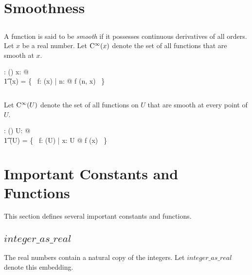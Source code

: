 \documentclass[11pt, oneside]{article}
\begin{document}
\section{Smoothness}

\subsection{}

A function is said to be {\it smooth} if it possesses continuous derivatives of all orders.
Let $x$ be a real number.
Let $\operatorname{C^{\infty}}(x)$ denote the set of all functions that are smooth at $x$.

\begin{axdef}
	\smoothR: \R \fun \power(\R \pfun \R)
\where
	\forall x: \R @ \\
	\t1	\smoothR(x) = \{~ f: \FunR(x) | \forall n: \nat @ f \in \CnR(n, x) ~\}
\end{axdef}

\subsection{}

Let $\operatorname{C^{\infty}}(U)$ denote the set of all functions on $U$ that are smooth at every point of $U$.

\begin{axdef}
	\smoothPR: \power \R \fun \power (\R \pfun \R)
\where
	\forall U: \power \R @ \\
	\t1	\smoothPR(U) = \{~ f: \FunPR(U) | \forall x: U @ f \in \smoothR(x) ~\}
\end{axdef}

\section{Important Constants and Functions}

This section defines several important constants and functions.

\subsection{$integer\_as\_real$}

The real numbers contain a natural copy of the integers.
Let $integer\_as\_real$ denote this embedding.

\end{document}
